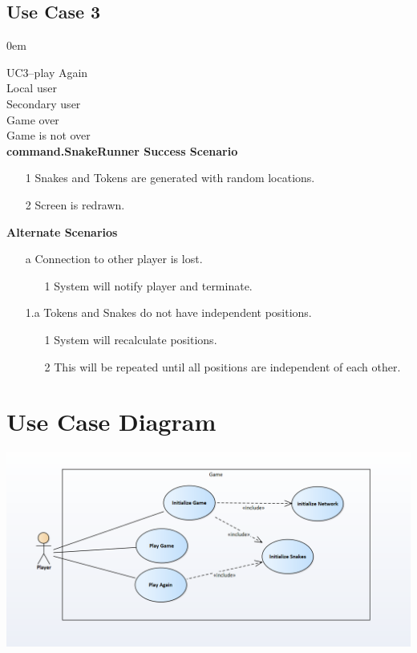 \documentclass[titlepage]{article}
\begin{document}
	\subsection{Use Case 3}
	\itemsep0em 
	
	\textbf{} UC3--play Again\\
	\textbf{} Local user\\
	\textbf{} Secondary user\\
	\textbf{} Game over\\
	\textbf{} Game is not over\\
	\textbf{command.SnakeRunner Success Scenario}
	\begin{enumerate}
		\itemsep0em 
		\item[1] Snakes and Tokens are generated with random locations.
		\item[2] Screen is redrawn.
	\end{enumerate}
	\textbf{Alternate Scenarios}
	\begin{enumerate}
		\itemsep0em 
		\item[a]Connection to other player is lost.
		\begin{enumerate}
			\itemsep0em 
			\item[1]System will notify player and terminate.
		\end{enumerate}
	\item[1.a]Tokens and Snakes do not have independent positions.
			\begin{enumerate}
		\itemsep0em 
		\item[1]System will recalculate positions.
		\item[2]This will be repeated until all positions are independent of each other.
	\end{enumerate}
		
	\end{enumerate}
	
	\section{Use Case Diagram}
	\includegraphics[scale=.75]{UCD}
	
\end{document}
